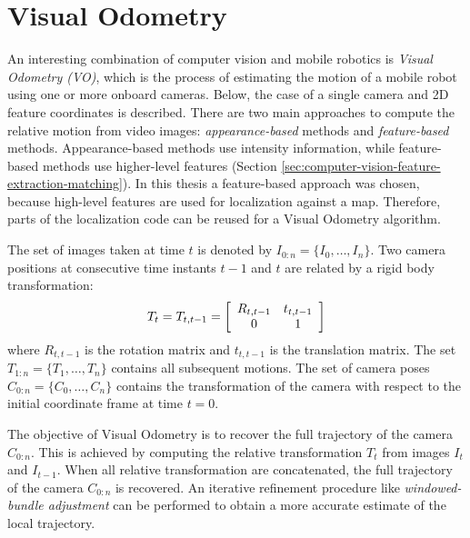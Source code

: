 \section{Visual Odometry}
\label{sec:background-visual-odometry}
An interesting combination of computer vision and mobile robotics is \textit{Visual Odometry (VO)}, which is the process of estimating the motion of a mobile robot using one or more onboard cameras.
Below,
the case of a single camera and 2D feature coordinates is described.
There are two main approaches to compute the relative motion from video images: \textit{appearance-based} methods and \textit{feature-based} methods.
Appearance-based methods use intensity information, while feature-based methods use higher-level features (Section \ref{sec:computer-vision-feature-extraction-matching}).
In this thesis a feature-based approach was chosen, because high-level features are used for localization against a map.
Therefore, parts of the localization code can be reused for a Visual Odometry algorithm.

The set of images taken at time $t$ is denoted by $I_{0:n} = \{I_0, \hdots, I_n\}$.
Two camera positions at consecutive time instants $t-1$ and $t$ are related by a rigid body transformation:
\begin{equation}
\label{eq:computer-vision-visual-odometry-T}
T_t = T_{t,t-1} = 
\left[ \begin{array}{c c}
R_{t,t-1} & t_{t,t-1} \\
0 & 1
\end{array} \right]
\end{equation}
where $R_{t,t-1}$ is the rotation matrix and $t_{t,t-1}$ is the translation matrix.
The set $T_{1:n} = \{T_1, \hdots, T_n\}$ contains all subsequent motions.
The set of camera poses $C_{0:n} = \{C_0, \hdots, C_n\}$ contains the transformation of the camera with respect to the initial coordinate frame at time $t = 0$.

The objective of Visual Odometry is to recover the full trajectory of the camera $C_{0:n}$.
This is achieved by computing the relative transformation $T_t$ from images $I_t$ and $I_{t-1}$.
When all relative transformation are concatenated, the full trajectory of the camera $C_{0:n}$ is recovered.
An iterative refinement procedure like \textit{windowed-bundle adjustment} \cite{engels2006bundle} can be performed to obtain a more accurate estimate of the local trajectory.

